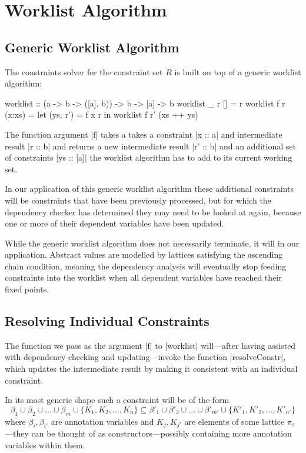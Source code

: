 \section{Worklist Algorithm}

\subsection{Generic Worklist Algorithm}

The constraints solver for the constraint set $R$ is built on top of a generic worklist algorithm:

\begin{code}
worklist :: (a -> b -> ([a], b)) -> b -> [a] -> b
worklist _  r  []      = r
worklist f  r  (x:xs)  = let (ys, r') = f x r in worklist f r' (xs ++ ys)
\end{code}

The function argument |f| takes a takes a constraint |x :: a| and intermediate result |r :: b| and returns a new intermediate result |r' :: b| and an additional set of constraints |ys :: [a]| the worklist algorithm has to add to its current working set.

In our application of this generic worklist algorithm these additional constraints will be constraints that have been previously processed, but for which the dependency checker has determined they may need to be looked at again, because one or more of their dependent variables have been updated.

While the generic worklist algorithm does not necessarily terminate, it will in our application. Abstract values are modelled by lattices satisfying the ascending chain condition, meaning the dependency analysis will eventually stop feeding constraints into the worklist when all dependent variables have reached their fixed points.

\subsection{Resolving Individual Constraints}\label{r532}

The function we pass as the argument |f| to |worklist| will---after having assisted with dependency checking and updating---invoke the function |resolveConstr|, which updates the intermediate result by making it consistent with an individual constraint.

In its most generic shape such a constraint will be of the form \[\beta_1 \cup \beta_2 \cup ... \cup \beta_m \cup \{K_1,K_2,...,K_n\} \subseteq \beta'_1 \cup\beta'_2 \cup ... \cup \beta'_{m'} \cup \{K'_1,K'_2,...,K'_{n'}\} \] where $\beta_i, \beta_{i'}$ are annotation variables and $K_j, K_{j'}$ are elements of some lattice $\pi_\tau$---they can be thought of as constructors---possibly containing more annotation variables within them.

